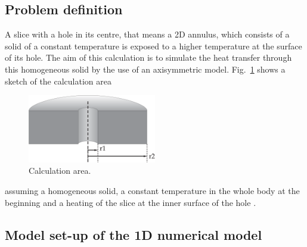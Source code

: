 \subsection{Problem definition}

A slice with a hole in its centre, that means a 2D annulus, which consists of a solid of a constant temperature is exposed to a higher temperature at the surface of its hole. The aim of this calculation is to simulate the heat transfer through this homogeneous solid by the use of an axisymmetric model. Fig.~\ref{figT1} shows a sketch of the calculation area
\begin{figure}%
\centering
\includegraphics[width=0.5\textwidth]{T/figures/radial-heat-transport.eps}
\caption{\label{figT1}Calculation area.}
\end{figure}
assuming a homogeneous solid, a constant temperature in the whole body at the beginning and a heating of the slice at the inner surface of the hole .
%

\subsection{Model set-up of the 1D numerical model}

